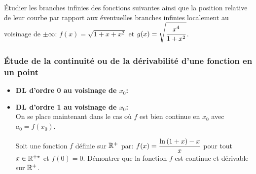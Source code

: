 \documentclass[a4paper, 11pt]{article}
\begin{document}
{{\footnotesize \begin{exercice} \'Etudier les branches infinies des fonctions suivantes ainsi que la position relative de leur courbe par rapport aux \'eventuelles branches infinies localement au voisinage de $\pm\infty$: $f(x)=\sqrt{1+x+x^2}$ et $g(x)=\displaystyle\sqrt{\displaystyle\frac{x^4}{1+x^2}}$.
\end{exercice}}

 
\subsubsection{\'Etude de la continuit\'e ou de la d\'erivabilit\'e d'une fonction en un point}

\begin{itemize}
\item[\Large{\ding{182}}] \textbf{DL d'ordre 0 au voisinage de $x_0$:}




\item[\Large{\ding{183}}] \textbf{DL d'ordre 1 au voisinage de $x_0$:}\\
\noindent On se place maintenant dans le cas o\`{u} $f$ est bien continue en $x_0$ avec $a_0=f(x_0)$.\vsec




{\footnotesize \begin{exercice} Soit une fonction $f$ d\'efinie sur $\mathbb{R}^+$ par: $f(x)=\displaystyle\frac{\ln{(1+x)}-x}{x}$ pour tout $x\in\mathbb{R}^{+\star}$ et $f(0)=0$. D\'emontrer que la fonction $f$ est continue et d\'erivable sur $\mathbb{R}^+$. 
 \end{exercice}}
\vspace{0.3cm}


\end{itemize}}
\end{document}
